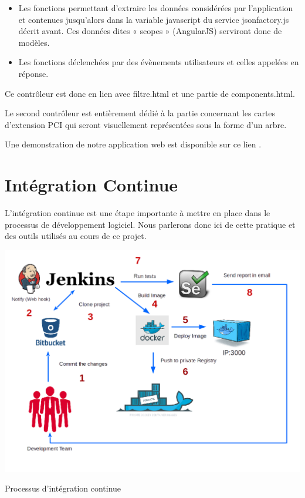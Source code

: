 \documentclass [a4paper,11pt]{article}
\begin{document}
\begin{itemize}
 \item Les fonctions permettant d’extraire les données considérées par l’application et contenues jusqu’alors dans la variable javascript du service jsonfactory.js décrit avant. Ces données dites « scopes » (AngularJS) serviront donc de modèles.
 \item Les fonctions déclenchées par des évènements utilisateurs et celles appelées en réponse.
 \newline
\end{itemize}

Ce contrôleur est donc en lien avec filtre.html et une partie de components.html.
\newline

Le second contrôleur est entièrement dédié à la partie concernant les cartes d’extension PCI qui seront visuellement représentées sous la forme d’un arbre.
\newline

Une demonstration de notre application web est disponible sur ce lien \cite{APPLI}.

\section{Intégration Continue}

L'intégration continue est une étape importante à mettre en place dans le processus de développement logiciel. Nous parlerons donc ici de cette pratique et des outils utilisés au cours de ce projet.

\begin{center}
\includegraphics[scale=0.5]{img/ci.png}
\caption{Processus d'intégration continue}
\end{center}
\end{document}
